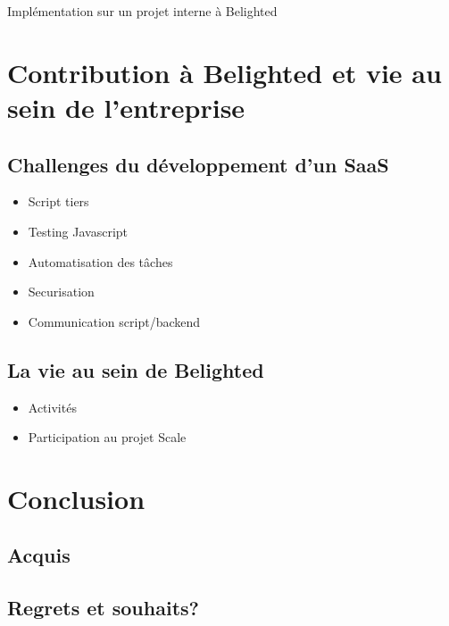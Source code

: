 \documentclass{article}
\begin{document}
    Implémentation sur un projet interne à Belighted


\section{Contribution à Belighted et vie au sein de l'entreprise}

  \subsection{Challenges du développement d'un SaaS}

    \begin{itemize}
      \item Script tiers
      \item Testing Javascript
      \item Automatisation des tâches
      \item Securisation
      \item Communication script/backend
    \end{itemize}

  \subsection{La vie au sein de Belighted}

    \begin{itemize}
      \item Activités
      \item Participation au projet Scale
    \end{itemize}


\section{Conclusion}

  \subsection{Acquis}

  \subsection{Regrets et souhaits?}
\end{document}

